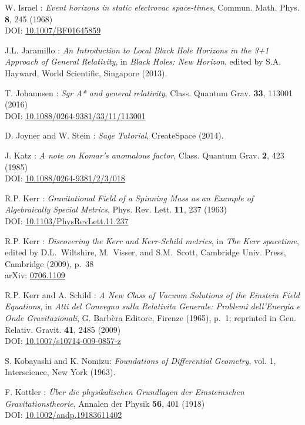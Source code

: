 \begin{thebibliography}{123}
W. Israel : {\em Event horizons in static electrovac space-times},
Commun. Math. Phys. {\bf 8}, 245 (1968)\\
DOI: \href{https://doi.org/10.1007/BF01645859}{10.1007/BF01645859}

J.L. Jaramillo : {\em An Introduction to Local Black Hole Horizons in the 3+1
Approach of General Relativity}, in {\em Black Holes: New Horizon}, edited
by S.A. Hayward, World Scientific, Singapore (2013).

T. Johannsen :
{\em Sgr A* and general relativity},
Class. Quantum Grav.  {\bf 33}, 113001 (2016)\\
DOI: \href{https://doi.org/10.1088/0264-9381/33/11/113001}{10.1088/0264-9381/33/11/113001}

D. Joyner and W. Stein : {\em Sage Tutorial}, CreateSpace (2014).

J. Katz :
{\em A note on Komar's anomalous factor},
Class. Quantum Grav. {\bf 2}, 423 (1985)\\
DOI: \href{https://doi.org/10.1088/0264-9381/2/3/018}{10.1088/0264-9381/2/3/018}

R.P. Kerr :
{\em Gravitational Field of a Spinning Mass as an Example of Algebraically Special Metrics},
Phys. Rev. Lett. {\bf 11}, 237 (1963)\\
DOI: \href{https://doi.org/10.1103/PhysRevLett.11.237}{10.1103/PhysRevLett.11.237}

R.P. Kerr : {\em Discovering the Kerr and Kerr-Schild metrics},
in {\em The Kerr spacetime}, edited by D.L.~Wiltshire, M.~Visser, and S.M.~Scott,
Cambridge Univ. Press, Cambridge (2009), p.~38\\
arXiv: \href{https://arxiv.org/abs/0706.1109}{0706.1109}

R.P. Kerr and A. Schild :
{\em A New Class of Vacuum Solutions of the Einstein Field Equations},
in {\em Atti del Convegno sulla Relativita Generale: Problemi
dell’Energia e Onde Gravitazionali}, G. Barbèra Editore,
Firenze (1965), p.~1; reprinted in
Gen. Relativ. Gravit. {\bf 41}, 2485 (2009)\\
DOI: \href{https://doi.org/10.1007/s10714-009-0857-z}{10.1007/s10714-009-0857-z}

S. Kobayashi and K. Nomizu:
{\em Foundations of Differential Geometry}, vol. 1,
Interscience, New York (1963).

F.  Kottler :
{\em \"Uber die physikalischen Grundlagen der Einsteinschen Gravitationstheorie},
Annalen der Physik {\bf 56}, 401 (1918)\\
DOI: \href{https://doi.org/10.1002/andp.19183611402}{10.1002/andp.19183611402}


\end{thebibliography}

